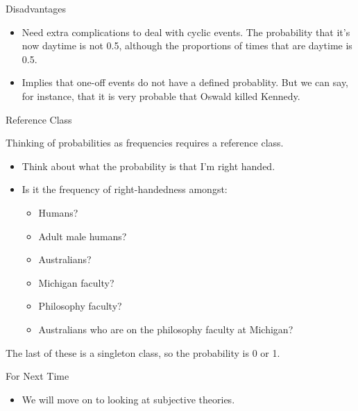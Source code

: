 \documentclass[
  ignorenonframetext,
]{beamer}
\providecommand{\tightlist}{%
  \setlength{\itemsep}{0pt}\setlength{\parskip}{0pt}}
\renewcommand{\,}{\text{, }}
\begin{document}
\begin{frame}{Disadvantages}
\protect\hypertarget{disadvantages}{}

\begin{itemize}
\tightlist
\item
  Need extra complications to deal with cyclic events. The probability
  that it's now daytime is not 0.5, although the proportions of times
  that are daytime is 0.5. \pause
\item
  Implies that one-off events do not have a defined probablity. But we
  can say, for instance, that it is very probable that Oswald killed
  Kennedy.
\end{itemize}

\end{frame}

\begin{frame}{Reference Class}
\protect\hypertarget{reference-class}{}

Thinking of probabilities as frequencies requires a reference class.

\begin{itemize}
\tightlist
\item
  Think about what the probability is that I'm right handed.
\item
  Is it the frequency of right-handedness amongst:

  \begin{itemize}
  \tightlist
  \item
    Humans? \pause
  \item
    Adult male humans? \pause
  \item
    Australians? \pause
  \item
    Michigan faculty? \pause
  \item
    Philosophy faculty? \pause
  \item
    Australians who are on the philosophy faculty at Michigan?
  \end{itemize}
\end{itemize}

The last of these is a singleton class, so the probability is 0 or 1.

\end{frame}

\begin{frame}{For Next Time}
\protect\hypertarget{for-next-time}{}

\begin{itemize}
\tightlist
\item
  We will move on to looking at subjective theories.
\end{itemize}

\end{frame}
\end{document}
